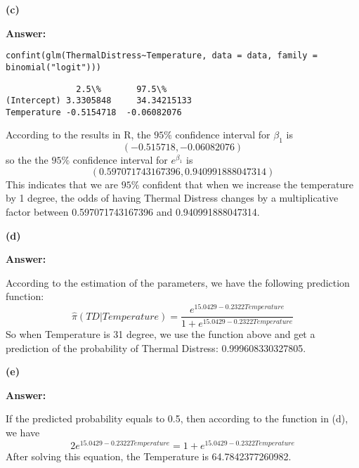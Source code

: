 \documentclass[letterpaper,11pt]{article}
\begin{document}
\begin{addmargin}[-1.1em]{0em}
  \textbf{(c)}\par
\end{addmargin}
\textbf{}\par
\bigbreak
\begin{addmargin}[-0.5em]{0em}
  \textbf{Answer: }
\end{addmargin}


\begin{lstlisting}
confint(glm(ThermalDistress~Temperature, data = data, family = binomial("logit")))
\end{lstlisting}

\begin{lstlisting}
              2.5\%	      97.5\%
(Intercept)	3.3305848	  34.34215133
Temperature	-0.5154718	-0.06082076
\end{lstlisting}
According to the results in R, the $95\%$ confidence interval for $\beta_1$ is $$(-0.515718,-0.06082076)$$
so the the $95\%$ confidence interval for $e^{\beta_1}$ is $$(0.597071743167396,0.940991888047314)$$
This indicates that we are $95\%$ confident that when we increase the temperature by 1 degree, the odds of having Thermal Distress changes by a multiplicative factor between 0.597071743167396 and 0.940991888047314.


\begin{addmargin}[-1.1em]{0em}
  \textbf{(d)}\par
\end{addmargin}
\textbf{}\par
\bigbreak
\begin{addmargin}[-0.5em]{0em}
  \textbf{Answer: }
\end{addmargin}

According to the estimation of the parameters, we have the following prediction function:
$$\hat\pi(TD\vert Temperature) = \frac{e^{15.0429-0.2322Temperature}}{1+e^{15.0429-0.2322Temperature}}$$
So when Temperature is 31 degree, we use the function above and get a prediction of the probability of Thermal Distress: 0.999608330327805.

\begin{addmargin}[-1.1em]{0em}
  \textbf{(e)}\par
\end{addmargin}
\textbf{}\par
\bigbreak
\begin{addmargin}[-0.5em]{0em}
  \textbf{Answer: }
\end{addmargin}
If the predicted probability equals to 0.5, then according to the function in (d), we have
$$2e^{15.0429-0.2322Temperature} = 1 + e^{15.0429-0.2322Temperature}$$
After solving this equation, the Temperature is 64.7842377260982.
\end{document}
